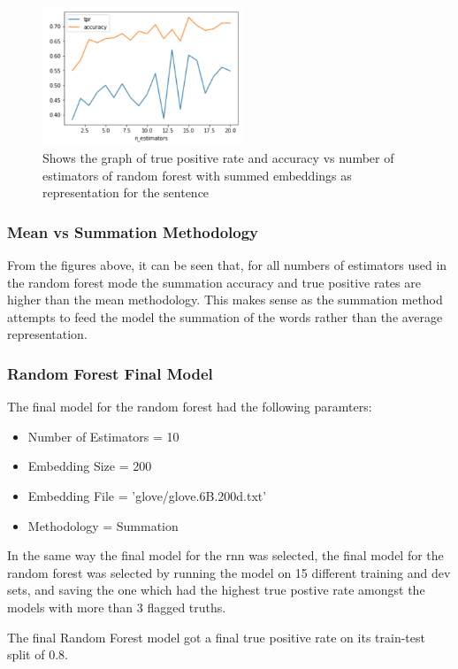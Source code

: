 \documentclass[twoside,twocolumn]{article}
\begin{document}
\begin{figure}[H]
\includegraphics[width=6cm]{randForest_estimators_meaned_graph-tpr}
\centering
\caption{Shows the graph of true positive rate and accuracy vs number of estimators of random forest 
with summed embeddings as representation for the sentence}
\end{figure}


\subsubsection{Mean vs Summation Methodology}

From the figures above, it can be seen that, for all numbers of estimators used in the
random forest mode the summation accuracy and true positive rates are higher than the mean
methodology. This makes sense as the summation method attempts to feed the model the summation
of the words rather than the average representation.

\subsubsection{Random Forest Final Model}

The final model for the random forest had the following paramters:

\begin{itemize}
\item Number of Estimators = 10
\item Embedding Size = 200
\item Embedding File = 'glove/glove.6B.200d.txt'
\item Methodology = Summation 
\end{itemize}

In the same way the final model for the rnn was selected, the final model for the random forest was
selected by running the model on 15 different training and dev sets, and saving the one which had the
highest true postive rate amongst the models with more than 3 flagged truths.

The final Random Forest model got a final true positive rate on its train-test split of 0.8.
\end{document}
